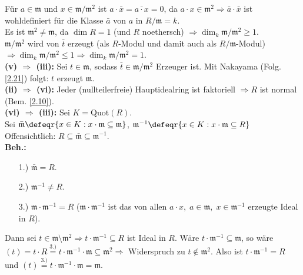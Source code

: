 \begin{Bew}
Für $a \in \mathfrak{m}$ und $x \in \mathfrak{m}/\mathfrak{m}^2$ ist $a \cdot
\bar{x} = \overline{a \cdot x} = 0$, da $a \cdot x \in \mathfrak{m}^2
\Rightarrow \bar{a} \cdot \bar{x}$ ist wohldefiniert für die Klasse $\bar{a}$
von $a$ in $R/\mathfrak{m} = k$.\\
Es ist $\mathfrak{m}^2 \not= \mathfrak{m}$, da $\dim R = 1$ (und $R$ noethersch)
$\Rightarrow \dim_k \mathfrak{m} / \mathfrak{m}^2 \geq 1$.\\
$\mathfrak{m}/\mathfrak{m}^2$ wird von $\bar{t}$ erzeugt (als $R$-Modul und
damit auch als $R/\mathfrak{m}$-Modul) $\Rightarrow \dim_k \mathfrak{m}/
\mathfrak{m}^2 \leq 1 \Rightarrow \dim_k \mathfrak{m}/\mathfrak{m}^2 = 1$.\\
\textbf{(v) $\Rightarrow$ (iii):} Sei $t \in \mathfrak{m}$, sodass $\bar{t} \in
\mathfrak{m}/\mathfrak{m}^2$ Erzeuger ist. Mit Nakayama (Folg. \ref{2.21}) folgt:
$t$ erzeugt $\mathfrak{m}$.\\
\textbf{(ii) $\Rightarrow$ (vi):} Jeder (nullteilerfreie) Hauptidealring ist
faktoriell $\Rightarrow R$ ist normal (Bem. \ref{2.10}).\\
\textbf{(vi) $\Rightarrow$ (iii):} Sei $K = \mathrm{Quot}(R)$.\\
Sei $\bar{\mathfrak{m}} \defeqr \{x \in K: x \cdot \mathfrak{m} \subseteq
\mathfrak{m}\}$, $\mathfrak{m}^{-1} \defeqr \{x \in K: x \cdot \mathfrak{m}
\subseteq R\}$\\
Offensichtlich: $R \subseteq \bar{\mathfrak{m}} \subseteq \mathfrak{m}^{-1}$.\\
\textbf{Beh.:} \begin{enumerate}
  \item[1.)] $\bar{\mathfrak{m}} = R$.
  \item[2.)] $\mathfrak{m}^{-1} \not= R$.
  \item[3.)] $\mathfrak{m} \cdot \mathfrak{m}^{-1}=R$ ($\mathfrak{m} \cdot
  \mathfrak{m}^{-1}$ ist das von allen $a \cdot x, \; a \in \mathfrak{m}, \; x
  \in \mathfrak{m}^{-1}$ erzeugte Ideal in $R$).
\end{enumerate}
Dann sei $t \in \mathfrak{m} \setminus \mathfrak{m}^2 \Rightarrow t \cdot
\mathfrak{m}^{-1} \subseteq R$ ist Ideal in $R$.
Wäre $ t \cdot \mathfrak{m}^{-1} \subseteq \mathfrak{m}$, so wäre $(t) = t \cdot
R \overset{3.)}{=} t \cdot \mathfrak{m}^{-1} \cdot \mathfrak{m} \subseteq
\mathfrak{m}^2 \Rightarrow$ Widerspruch zu $t \not\in \mathfrak{m}^2$.
Also ist $t \cdot \mathfrak{m}^{-1} = R$ und $(t) \overset{3.)}{=} t \cdot
\mathfrak{m}^{-1} \cdot \mathfrak{m} = \mathfrak{m}$.\\

\end{Bew}
